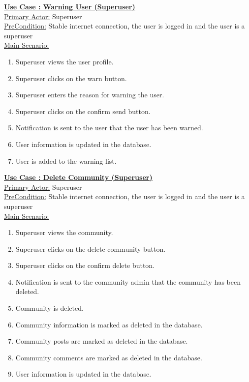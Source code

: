 \documentclass[conference,compsoc]{IEEEtran}
\newcounter{UC}
\newcommand{\nextU}{\stepcounter{UC}\theUC}
\begin{document}
\underline{\textbf{Use Case \nextU: Warning User (Superuser)}}\\

\underline{Primary Actor:} Superuser\\

\underline{PreCondition:} Stable internet connection, the user is logged in and the user is a superuser\\

\underline{Main Scenario:}\\
\begin{enumerate}
    \item Superuser views the user profile.
    \item Superuser clicks on the warn button.
    \item Superuser enters the reason for warning the user.
    \item Superuser clicks on the confirm send button.
    \item Notification is sent to the user that the user has been warned.
    \item User information is updated in the database.
    \item User is added to the warning list.
\end{enumerate}

\underline{\textbf{Use Case \nextU: Delete Community (Superuser)}}\\

\underline{Primary Actor:} Superuser\\

\underline{PreCondition:} Stable internet connection, the user is logged in and the user is a superuser\\

\underline{Main Scenario:}\\
\begin{enumerate}
    \item Superuser views the community.
    \item Superuser clicks on the delete community button.
    \item Superuser clicks on the confirm delete button.
    \item Notification is sent to the community admin that the community has been deleted.
    \item Community is deleted.
    \item Community information is marked as deleted in the database.
    \item Community posts are marked as deleted in the database.
    \item Community comments are marked as deleted in the database.
    \item User information is updated in the database.
\end{enumerate}
\end{document}
